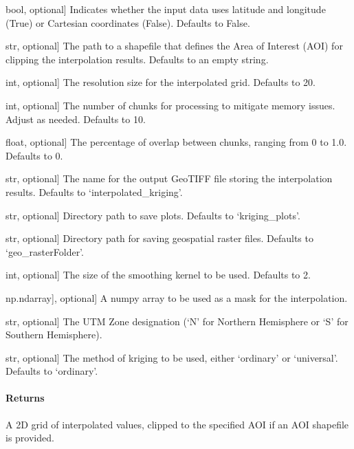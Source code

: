 \documentclass[letterpaper,10pt,english]{sphinxmanual}
\begin{document}
\begin{fulllineitems}
\begin{description}
\sphinxlineitem{latlon}{[}bool, optional{]}
\sphinxAtStartPar
Indicates whether the input data uses latitude and longitude (True) or Cartesian coordinates (False). 
Defaults to False.

\sphinxlineitem{aoi\_shapefile}{[}str, optional{]}
\sphinxAtStartPar
The path to a shapefile that defines the Area of Interest (AOI) for clipping the interpolation results. 
Defaults to an empty string.

\sphinxlineitem{pixel\_size}{[}int, optional{]}
\sphinxAtStartPar
The resolution size for the interpolated grid. Defaults to 20.

\sphinxlineitem{num\_chunks}{[}int, optional{]}
\sphinxAtStartPar
The number of chunks for processing to mitigate memory issues. Adjust as needed. Defaults to 10.

\sphinxlineitem{overlap\_percentage}{[}float, optional{]}
\sphinxAtStartPar
The percentage of overlap between chunks, ranging from 0 to 1.0. Defaults to 0.

\sphinxlineitem{out\_fileName}{[}str, optional{]}
\sphinxAtStartPar
The name for the output GeoTIFF file storing the interpolation results. Defaults to ‘interpolated\_kriging’.

\sphinxlineitem{plot\_folder}{[}str, optional{]}
\sphinxAtStartPar
Directory path to save plots. Defaults to ‘kriging\_plots’.

\sphinxlineitem{geo\_folder}{[}str, optional{]}
\sphinxAtStartPar
Directory path for saving geospatial raster files. Defaults to ‘geo\_rasterFolder’.

\sphinxlineitem{smoothing\_kernel}{[}int, optional{]}
\sphinxAtStartPar
The size of the smoothing kernel to be used. Defaults to 2.

\sphinxlineitem{mask}{[}{[}np.ndarray{]}, optional{]}
\sphinxAtStartPar
A numpy array to be used as a mask for the interpolation.

\sphinxlineitem{UTM\_Zone}{[}str, optional{]}
\sphinxAtStartPar
The UTM Zone designation (‘N’ for Northern Hemisphere or ‘S’ for Southern Hemisphere).

\sphinxlineitem{krig\_method}{[}str, optional{]}
\sphinxAtStartPar
The method of kriging to be used, either ‘ordinary’ or ‘universal’. Defaults to ‘ordinary’.

\end{description}


\paragraph{Returns}
\label{\detokenize{akhdefo_functions:id22}}\begin{description}
\sphinxAtStartPar
A 2D grid of interpolated values, clipped to the specified AOI if an AOI shapefile is provided.


\end{description}
\end{fulllineitems}
\end{document}
